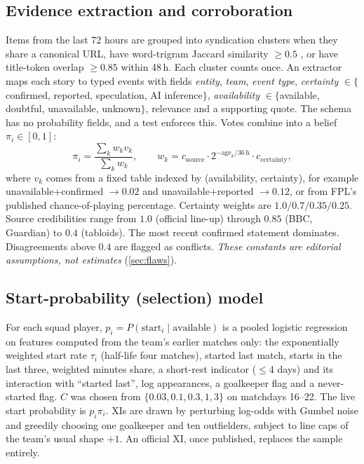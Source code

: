 \documentclass[11pt,a4paper]{article}
\begin{document}
\subsection{Evidence extraction and corroboration}\label{sec:evidence}

Items from the last 72 hours are grouped into syndication clusters when they
share a canonical URL, have word-trigram Jaccard similarity $\ge0.5$
\citep{broder1997}, or have title-token overlap $\ge0.85$ within 48\,h. Each
cluster counts once. An extractor maps each story to typed events with fields
\emph{entity}, \emph{team}, \emph{event type}, \emph{certainty}
$\in\{$confirmed, reported, speculation, AI inference$\}$,
\emph{availability} $\in\{$available, doubtful, unavailable, unknown$\}$,
relevance and a supporting quote. The schema has no probability fields, and a
test enforces this. Votes combine into a belief $\pi_i\in[0,1]$:
\begin{equation}
  \pi_i = \frac{\sum_k w_k v_k}{\sum_k w_k},\qquad
  w_k = c_{\text{source}}\cdot 2^{-\text{age}_k/36\,\text{h}}\cdot c_{\text{certainty}},
\end{equation}
where $v_k$ comes from a fixed table indexed by (availability, certainty), for
example unavailable+confirmed $\to0.02$ and unavailable+reported $\to0.12$, or
from FPL's published chance-of-playing percentage. Certainty weights are
$1.0/0.7/0.35/0.25$. Source credibilities range from $1.0$ (official line-up)
through $0.85$ (BBC, Guardian) to $0.4$ (tabloids). The most recent confirmed
statement dominates. Disagreements above $0.4$ are flagged as conflicts.
\emph{These constants are editorial assumptions, not estimates}
(\cref{sec:flaws}).

\subsection{Start-probability (selection) model}\label{sec:selection}

For each squad player, $p_i=P(\text{start}_i\mid\text{available})$ is a pooled
logistic regression on features computed from the team's earlier matches only:
the exponentially weighted start rate $\tau_i$ (half-life four matches),
started last match, starts in the last three, weighted minutes share, a
short-rest indicator ($\le4$ days) and its interaction with ``started last'',
log appearances, a goalkeeper flag and a never-started flag. $C$ was chosen
from $\{0.03,0.1,0.3,1,3\}$ on matchdays 16--22. The live start probability is
$p_i\pi_i$. XIs are drawn by perturbing log-odds with Gumbel noise
\citep{kool2019} and greedily choosing one goalkeeper and ten outfielders,
subject to line caps of the team's usual shape $+1$. An official XI, once
published, replaces the sample entirely.
\end{document}

